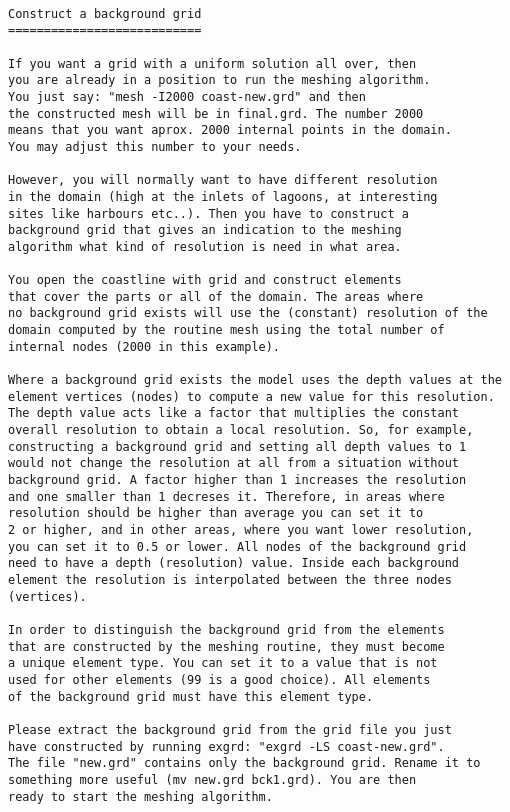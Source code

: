 
\begin{verbatim}

Construct a background grid
===========================

If you want a grid with a uniform solution all over, then
you are already in a position to run the meshing algorithm.
You just say: "mesh -I2000 coast-new.grd" and then 
the constructed mesh will be in final.grd. The number 2000
means that you want aprox. 2000 internal points in the domain.
You may adjust this number to your needs.

However, you will normally want to have different resolution
in the domain (high at the inlets of lagoons, at interesting
sites like harbours etc..). Then you have to construct a
background grid that gives an indication to the meshing
algorithm what kind of resolution is need in what area.

You open the coastline with grid and construct elements
that cover the parts or all of the domain. The areas where
no background grid exists will use the (constant) resolution of the
domain computed by the routine mesh using the total number of
internal nodes (2000 in this example).

Where a background grid exists the model uses the depth values at the
element vertices (nodes) to compute a new value for this resolution.
The depth value acts like a factor that multiplies the constant
overall resolution to obtain a local resolution. So, for example,
constructing a background grid and setting all depth values to 1
would not change the resolution at all from a situation without
background grid. A factor higher than 1 increases the resolution
and one smaller than 1 decreses it. Therefore, in areas where
resolution should be higher than average you can set it to
2 or higher, and in other areas, where you want lower resolution,
you can set it to 0.5 or lower. All nodes of the background grid
need to have a depth (resolution) value. Inside each background
element the resolution is interpolated between the three nodes
(vertices).

In order to distinguish the background grid from the elements
that are constructed by the meshing routine, they must become 
a unique element type. You can set it to a value that is not
used for other elements (99 is a good choice). All elements
of the background grid must have this element type.

Please extract the background grid from the grid file you just
have constructed by running exgrd: "exgrd -LS coast-new.grd".
The file "new.grd" contains only the background grid. Rename it to
something more useful (mv new.grd bck1.grd). You are then
ready to start the meshing algorithm.


\end{verbatim}
